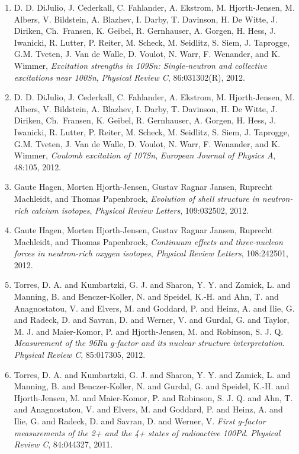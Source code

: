 \documentclass[%
oneside,                 %
final,                   %
10pt]{article}
\begin{document}
\begin{enumerate}
\item D. D. DiJulio, J. Cederkall, C. Fahlander, A. Ekstrom, M. Hjorth-Jensen, M. Albers, V. Bildstein, A. Blazhev, I. Darby, T. Davinson, H. De Witte, J. Diriken, Ch.~Fransen, K. Geibel, R. Gernhauser, A. Gorgen, H. Hess, J. Iwanicki, R. Lutter, P. Reiter, M. Scheck, M. Seidlitz, S. Siem, J. Taprogge, G.M. Tveten, J. Van de Walle, D. Voulot, N. Warr, F. Wenander, and K. Wimmer,  \emph{Excitation strengths in 109Sn: Single-neutron and collective excitations near 100Sn},   \emph{Physical Review C},  86:031302(R), 2012. 

\item D. D. DiJulio, J. Cederkall, C. Fahlander, A. Ekstrom, M. Hjorth-Jensen, M. Albers, V. Bildstein, A. Blazhev, I. Darby, T. Davinson, H. De Witte, J. Diriken, Ch.~Fransen, K. Geibel, R. Gernhauser, A. Gorgen, H. Hess, J. Iwanicki, R. Lutter, P. Reiter, M. Scheck, M. Seidlitz, S. Siem, J. Taprogge, G.M. Tveten, J. Van de Walle, D. Voulot, N. Warr, F. Wenander, and K. Wimmer,  \emph{Coulomb excitation of 107Sn},   \emph{European Journal of Physics A}, 48:105,  2012.  

\item Gaute Hagen, Morten Hjorth-Jensen, Gustav Ragnar Jansen, Ruprecht Machleidt, and Thomas Papenbrock, \emph{Evolution of shell structure in neutron-rich calcium isotopes},   \emph{Physical Review Letters}, 109:032502, 2012. 

\item Gaute Hagen, Morten Hjorth-Jensen, Gustav Ragnar Jansen, Ruprecht Machleidt, and Thomas Papenbrock, \emph{Continuum effects and three-nucleon forces in neutron-rich  oxygen isotopes},   \emph{Physical Review Letters}, 108:242501, 2012.  

\item Torres, D. A. and Kumbartzki, G. J. and Sharon, Y. Y. and Zamick, 	L. and Manning, B. and Benczer-Koller, N. and Speidel, K.-H. and 	Ahn, T. and Anagnostatou, V. and Elvers, M. and Goddard, P. and Heinz, 	A. and Ilie, G. and Radeck, D. and Savran, D. and Werner, V. and 	Gurdal, G. and Taylor, M. J. and Maier-Komor, P. and Hjorth-Jensen, 	M. and Robinson, S. J. Q.  \emph{Measurement of the 96Ru g-factor and its nuclear structure interpretation}.  \emph{Physical Review C}, 85:017305, 2012.  

\item Torres, D. A. and Kumbartzki, G. J. and Sharon, Y. Y. and Zamick, 	L. and Manning, B. and Benczer-Koller, N. and Gurdal, G. and Speidel, 	K.-H. and Hjorth-Jensen, M. and Maier-Komor, P. and Robinson, S. J. Q. and Ahn, T. and Anagnostatou, V. and Elvers, M. and Goddard, 	P. and Heinz, A. and Ilie, G. and Radeck, D. and Savran, D. and Werner, V.  \emph{First g-factor measurements of the 2+ and the 4+ states of radioactive 100Pd}.  \emph{Physical Review C}, 84:044327, 2011.  


\end{enumerate}
\end{document}
